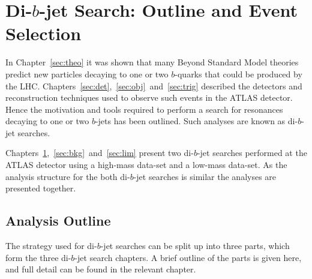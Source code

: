 \chapter{Di-$b$-jet Search: Outline and Event Selection}
\label{sec:evt}

In Chapter~\ref{sec:theo} it was shown that many Beyond Standard Model theories
predict new particles decaying to one or two $b$-quarks that could be produced by the LHC.
Chapters~\ref{sec:det},~\ref{sec:obj}~and~\ref{sec:trig}
described the detectors and reconstruction techniques used to observe such events in the ATLAS detector.
Hence the motivation and tools required to perform a  search
for resonances decaying to one or two $b$-jets has been outlined.
Such analyses are known as di-$b$-jet searches.

Chapters~\ref{sec:evt},~\ref{sec:bkg}~and~\ref{sec:lim} present two di-$b$-jet searches performed
at the ATLAS detector using a high-mass data-set and a low-mass data-set.
As the analysis structure for the both di-$b$-jet searches is similar the analyses are presented together.

\section{Analysis Outline}
\label{sec:evt-outline}

The strategy used for di-$b$-jet searches
can be split up into three parts,
which form the three di-$b$-jet search chapters.
A brief outline of the parts is given here,
and full detail can be found in the relevant chapter.

